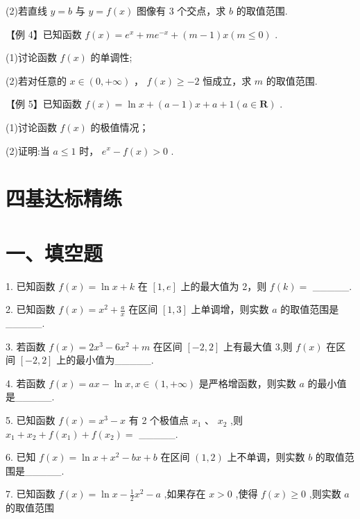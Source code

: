 (2)若直线 $y = b$ 与 $y = f\left( x\right)$ 图像有 3 个交点，求 $b$ 的取值范围.

【例 4】已知函数 $f\left( x\right)  = {{e}}^{x} + m{{e}}^{-x} + \left( {m - 1}\right) x\left( {m \leq  0}\right)$ .

(1)讨论函数 $f\left( x\right)$ 的单调性;

(2)若对任意的 $x \in  \left( {0, + \infty }\right)$ ， $f\left( x\right)  \geq   - 2$ 恒成立，求 $m$ 的取值范围.


【例 5】已知函数 $f\left( x\right)  = \ln x + \left( {a - 1}\right) x + a + 1\left( {a \in  \mathbf{R}}\right)$ .

(1)讨论函数 $f\left( x\right)$ 的极值情况；

(2)证明:当 $a \leq  1$ 时， ${{e}}^{x} - f\left( x\right)  > 0$ .

\section*{四基达标精练}

\section*{一、填空题}

1. 已知函数 $f\left( x\right)  = \ln x + k$ 在 $\left\lbrack  {1,{e}}\right\rbrack$ 上的最大值为 2，则 $f\left( k\right)  =$ \_\_\_\_\_.

2. 已知函数 $f\left( x\right)  = {x}^{2} + \frac{a}{x}$ 在区间 $\left\lbrack  {1,3}\right\rbrack$ 上单调增，则实数 $a$ 的取值范围是\_\_\_\_\_.

3. 若函数 $f\left( x\right)  = 2{x}^{3} - 6{x}^{2} + m$ 在区间 $\left\lbrack  {-2,2}\right\rbrack$ 上有最大值 3,则 $f\left( x\right)$ 在区间 $\left\lbrack  {-2,2}\right\rbrack$ 上的最小值为\_\_\_\_\_.

4. 若函数 $f\left( x\right)  = {ax} - \ln x,x \in  \left( {1, + \infty }\right)$ 是严格增函数，则实数 $a$ 的最小值是\_\_\_\_\_.

5. 已知函数 $f\left( x\right)  = {x}^{3} - x$ 有 2 个极值点 ${x}_{1}\text{ 、 }{x}_{2}$ ,则 ${x}_{1} + {x}_{2} + f\left( {x}_{1}\right)  + f\left( {x}_{2}\right)  =$ \_\_\_\_\_.

6. 已知 $f\left( x\right)  = \ln x + {x}^{2} - {bx} + b$ 在区间 $\left( {1,2}\right)$ 上不单调，则实数 $b$ 的取值范围是\_\_\_\_\_.

7. 已知函数 $f\left( x\right)  = \ln x - \frac{1}{2}{x}^{2} - a$ ,如果存在 $x > 0$ ,使得 $f\left( x\right)  \geq  0$ ,则实数 $a$ 的取值范围

